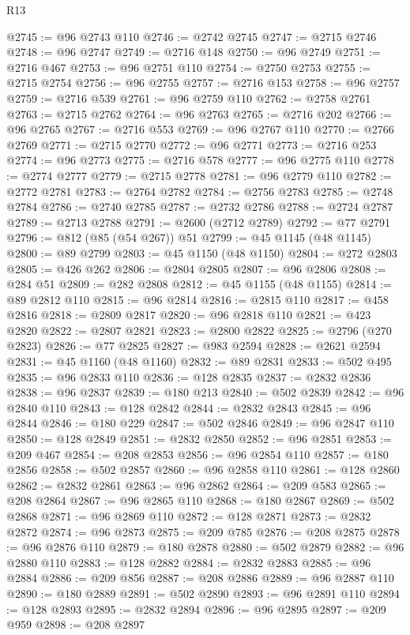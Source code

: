 \begin{lexlean}{R13}
\begin{coremodule}
@2745 := @96 @2743 @110
@2746 := @2742 @2745
@2747 := @2715 @2746
@2748 := @96 @2747
@2749 := @2716 @148
@2750 := @96 @2749
@2751 := @2716 @467
@2753 := @96 @2751 @110
@2754 := @2750 @2753
@2755 := @2715 @2754
@2756 := @96 @2755
@2757 := @2716 @153
@2758 := @96 @2757
@2759 := @2716 @539
@2761 := @96 @2759 @110
@2762 := @2758 @2761
@2763 := @2715 @2762
@2764 := @96 @2763
@2765 := @2716 @202
@2766 := @96 @2765
@2767 := @2716 @553
@2769 := @96 @2767 @110
@2770 := @2766 @2769
@2771 := @2715 @2770
@2772 := @96 @2771
@2773 := @2716 @253
@2774 := @96 @2773
@2775 := @2716 @578
@2777 := @96 @2775 @110
@2778 := @2774 @2777
@2779 := @2715 @2778
@2781 := @96 @2779 @110
@2782 := @2772 @2781
@2783 := @2764 @2782
@2784 := @2756 @2783
@2785 := @2748 @2784
@2786 := @2740 @2785
@2787 := @2732 @2786
@2788 := @2724 @2787
@2789 := @2713 @2788
@2791 := @2600 (@2712 @2789)
@2792 := @77 @2791
@2796 := @812 (@85 (@54 @267)) @51
@2799 := @45 @1145 (@48 @1145)
@2800 := @89 @2799
@2803 := @45 @1150 (@48 @1150)
@2804 := @272 @2803
@2805 := @426 @262
@2806 := @2804 @2805
@2807 := @96 @2806
@2808 := @284 @51
@2809 := @282 @2808
@2812 := @45 @1155 (@48 @1155)
@2814 := @89 @2812 @110
@2815 := @96 @2814
@2816 := @2815 @110
@2817 := @458 @2816
@2818 := @2809 @2817
@2820 := @96 @2818 @110
@2821 := @423 @2820
@2822 := @2807 @2821
@2823 := @2800 @2822
@2825 := @2796 (@270 @2823)
@2826 := @77 @2825
@2827 := @983 @2594
@2828 := @2621 @2594
@2831 := @45 @1160 (@48 @1160)
@2832 := @89 @2831
@2833 := @502 @495
@2835 := @96 @2833 @110
@2836 := @128 @2835
@2837 := @2832 @2836
@2838 := @96 @2837
@2839 := @180 @213
@2840 := @502 @2839
@2842 := @96 @2840 @110
@2843 := @128 @2842
@2844 := @2832 @2843
@2845 := @96 @2844
@2846 := @180 @229
@2847 := @502 @2846
@2849 := @96 @2847 @110
@2850 := @128 @2849
@2851 := @2832 @2850
@2852 := @96 @2851
@2853 := @209 @467
@2854 := @208 @2853
@2856 := @96 @2854 @110
@2857 := @180 @2856
@2858 := @502 @2857
@2860 := @96 @2858 @110
@2861 := @128 @2860
@2862 := @2832 @2861
@2863 := @96 @2862
@2864 := @209 @583
@2865 := @208 @2864
@2867 := @96 @2865 @110
@2868 := @180 @2867
@2869 := @502 @2868
@2871 := @96 @2869 @110
@2872 := @128 @2871
@2873 := @2832 @2872
@2874 := @96 @2873
@2875 := @209 @785
@2876 := @208 @2875
@2878 := @96 @2876 @110
@2879 := @180 @2878
@2880 := @502 @2879
@2882 := @96 @2880 @110
@2883 := @128 @2882
@2884 := @2832 @2883
@2885 := @96 @2884
@2886 := @209 @856
@2887 := @208 @2886
@2889 := @96 @2887 @110
@2890 := @180 @2889
@2891 := @502 @2890
@2893 := @96 @2891 @110
@2894 := @128 @2893
@2895 := @2832 @2894
@2896 := @96 @2895
@2897 := @209 @959
@2898 := @208 @2897

\end{coremodule}
\end{lexlean}
